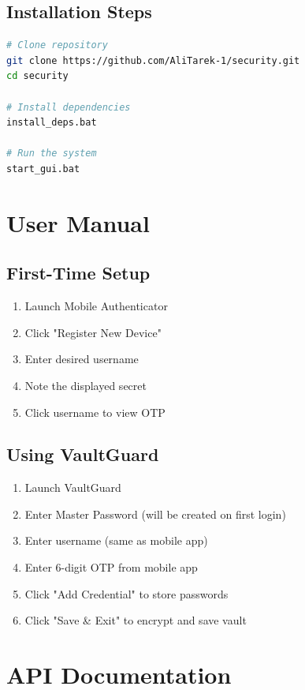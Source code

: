 \documentclass[12pt,a4paper]{report}
\begin{document}
\section{Installation Steps}

\begin{lstlisting}[language=bash]
# Clone repository
git clone https://github.com/AliTarek-1/security.git
cd security

# Install dependencies
install_deps.bat

# Run the system
start_gui.bat
\end{lstlisting}

\chapter{User Manual}

\section{First-Time Setup}

\begin{enumerate}
    \item Launch Mobile Authenticator
    \item Click "Register New Device"
    \item Enter desired username
    \item Note the displayed secret
    \item Click username to view OTP
\end{enumerate}

\section{Using VaultGuard}

\begin{enumerate}
    \item Launch VaultGuard
    \item Enter Master Password (will be created on first login)
    \item Enter username (same as mobile app)
    \item Enter 6-digit OTP from mobile app
    \item Click "Add Credential" to store passwords
    \item Click "Save & Exit" to encrypt and save vault
\end{enumerate}

\chapter{API Documentation}
\end{document}
